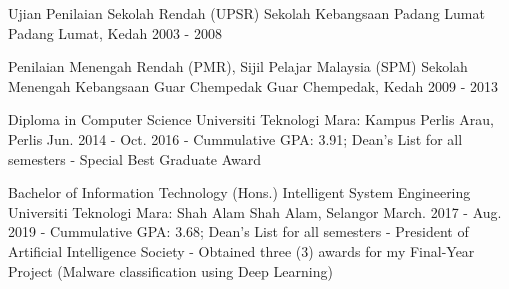 

\begin{cventries}


\cventry
  {Ujian Penilaian Sekolah Rendah (UPSR)}
  {Sekolah Kebangsaan Padang Lumat}
  {Padang Lumat, Kedah}
  {2003 - 2008}
  {}

\cventry
  {Penilaian Menengah Rendah (PMR), Sijil Pelajar Malaysia (SPM)}
  {Sekolah Menengah Kebangsaan Guar Chempedak}
  {Guar Chempedak, Kedah}
  {2009 - 2013}
  {}

\cventry
  {Diploma in Computer Science}
  {Universiti Teknologi Mara: Kampus Perlis}
  {Arau, Perlis}
  {Jun. 2014 - Oct. 2016}
  {
    - Cummulative GPA: 3.91; Dean's List for all semesters
    \newline
    - Special Best Graduate Award
  }

\hfill \break

\cventry
  {Bachelor of Information Technology (Hons.) Intelligent System Engineering}
  {Universiti Teknologi Mara: Shah Alam}
  {Shah Alam, Selangor}
  {March. 2017 - Aug. 2019}
  {
    - Cummulative GPA: 3.68; Dean's List for all semesters
    \newline
    - President of Artificial Intelligence Society
    \newline
    - Obtained three (3) awards for my Final-Year Project (Malware classification using Deep Learning)
  }

\end{cventries}
